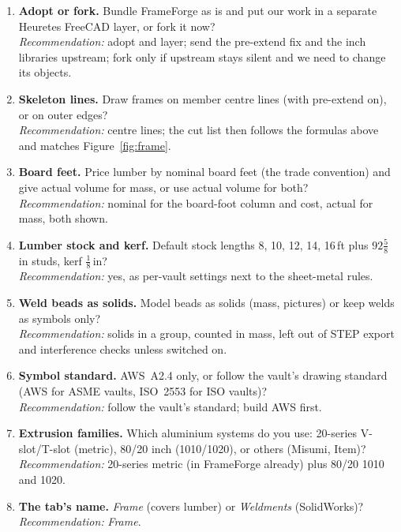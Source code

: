 \begin{enumerate}
  \item \textbf{Adopt or fork.} Bundle FrameForge as is and put our work in a separate Heuretes FreeCAD layer, or fork it now?\\
        \emph{Recommendation:} adopt and layer; send the pre-extend fix and the inch libraries upstream; fork only if
        upstream stays silent and we need to change its objects.
  \item \textbf{Skeleton lines.} Draw frames on member centre lines (with pre-extend on), or on outer edges?\\
        \emph{Recommendation:} centre lines; the cut list then follows the formulas above and matches
        Figure~\ref{fig:frame}.
  \item \textbf{Board feet.} Price lumber by nominal board feet (the trade convention) and give actual volume for mass,
        or use actual volume for both?\\
        \emph{Recommendation:} nominal for the board-foot column and cost, actual for mass, both shown.
  \item \textbf{Lumber stock and kerf.} Default stock lengths 8, 10, 12, 14, 16\,ft plus $92\tfrac58$\,in studs, kerf
        $\tfrac18$\,in?\\
        \emph{Recommendation:} yes, as per-vault settings next to the sheet-metal rules.
  \item \textbf{Weld beads as solids.} Model beads as solids (mass, pictures) or keep welds as symbols only?\\
        \emph{Recommendation:} solids in a  group, counted in mass, left out of STEP export and
        interference checks unless switched on.
  \item \textbf{Symbol standard.} AWS~A2.4 only, or follow the vault's drawing standard (AWS for ASME vaults, ISO~2553
        for ISO vaults)?\\
        \emph{Recommendation:} follow the vault's standard; build AWS first.
  \item \textbf{Extrusion families.} Which aluminium systems do you use: 20-series V-slot/T-slot (metric), 80/20 inch
        (1010/1020), or others (Misumi, Item)?\\
        \emph{Recommendation:} 20-series metric (in FrameForge already) plus 80/20 1010 and 1020.
  \item \textbf{The tab's name.} \emph{Frame} (covers lumber) or \emph{Weldments} (SolidWorks)?\\
        \emph{Recommendation:} \emph{Frame}.
\end{enumerate}
